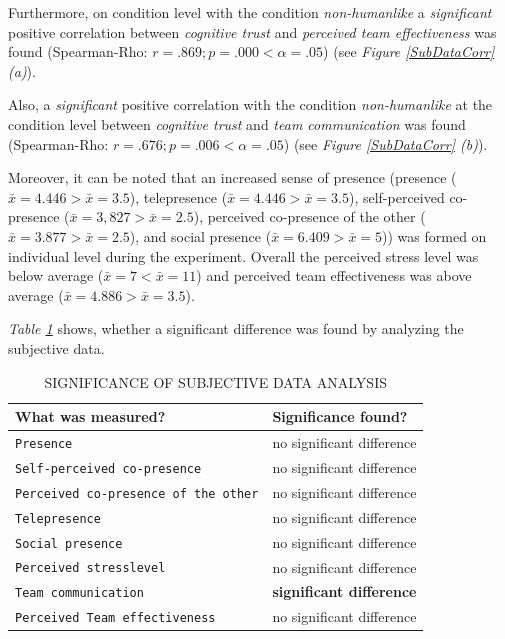 \documentclass[sigchi]{acmart}
\begin{document}
Furthermore, on condition level with the condition \textit{non-humanlike} a \textit{significant} positive correlation between \textit{cognitive trust} and \textit{perceived team effectiveness} was found (Spearman-Rho: $r =.869; p =.000 < \alpha = .05$) (see \textit{Figure \ref{SubDataCorr} (a)}).

Also, a \textit{significant} positive correlation with the condition \textit{non-humanlike} at the condition level between \textit{cognitive trust} and \textit{team communication} was found (Spearman-Rho: $r =.676; p =.006 < \alpha = .05$) (see \textit{Figure \ref{SubDataCorr} (b)}).

Moreover, it can be noted that an increased sense of presence (presence ($\bar{x} = 4.446 > \bar{x} = 3.5$), telepresence ($\bar{x} = 4.446 > \bar{x} = 3.5$), self-perceived co-presence ($\bar{x} = 3, 827 > \bar{x} = 2.5$), perceived co-presence of the other ($\bar{x} = 3.877 > \bar{x} = 2.5$), and social presence ($\bar{x} = 6.409 > \bar{x} = 5$)) was formed on individual level during the experiment. Overall the perceived stress level was below average ($\bar{x} = 7 < \bar{x} = 11$) and perceived team effectiveness was above average ($\bar{x} = 4.886 > \bar{x} = 3.5$).

\textit{Table \ref{SubDataSigs}} shows, whether a significant difference was found by analyzing the subjective data.

\begin{table}
	\caption{SIGNIFICANCE OF SUBJECTIVE DATA ANALYSIS}
  \label{SubDataSigs}
  \begin{tabular}{ll}
    \toprule
    What was measured? & Significance found? \\
    \midrule
     \texttt{Presence} & no significant difference \\
   	 \texttt{Self-perceived co-presence} & no significant difference \\
     \texttt{Perceived co-presence of the other} & no significant difference  \\
     \texttt{Telepresence} & no significant difference \\
     \texttt{Social presence} & no significant difference \\
     \texttt{Perceived stresslevel} & no significant difference \\
     \texttt{Team communication} & \textbf{significant difference} \\
     \texttt{Perceived Team effectiveness} & no significant difference  \\
    \bottomrule
  \end{tabular}
\end{table}
\end{document}
